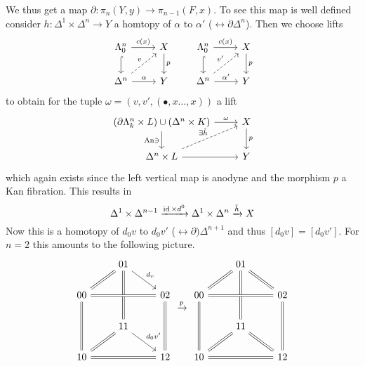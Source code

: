 \begin{construction}
    We thus get a map $\partial \colon \pi_n(Y,y) \to \pi_{n-1}(F,x)$.
    To see this map is well defined consider $h\colon \Delta^1 \times \Delta^n \to Y$ a homtopy of $\alpha$ to $\alpha'$ ($\rel \partial \Delta^n$).
    Then we choose lifts 
    \[
    \begin{tikzcd}
        \Lambda_0^n
        \ar[r, "c(x)"]
        \ar[d, hook]
        &
        X
        \ar[d,"p"]
        \\
        \Delta^n 
        \ar[ru, dashed, "v"]
        \ar[r, "\alpha"]
        &
        Y
    \end{tikzcd}
    \qquad
    \begin{tikzcd}
        \Lambda_0^n
        \ar[r, "c(x)"]
        \ar[d, hook]
        &
        X
        \ar[d,"p"]
        \\
        \Delta^n 
        \ar[ru, dashed, "v'"]
        \ar[r, "\alpha'"]
        &
        Y
    \end{tikzcd}
    \]
    to obtain for the tuple $\omega=(v,v',(\bullet,x \dotsc, x))$ a lift
    \[
    \begin{tikzcd}
        (\partial \Lambda_k^n \times L) \cup (\Delta^n \times K)
        \ar[r, "\omega"]
        \ar[d, "\An \ni"']
        &
        X
        \ar[d, "p"]
        \\
        \Delta^n \times L 
        \ar[r]
        \ar[ru, dashed, "\exists \Tilde{h}"]
        &
        Y
    \end{tikzcd}
    \]
    which again exists since the left vertical map is anodyne and the morphism $p$ a Kan fibration.
    This results in 
    \[
        \Delta^1 \times \Delta^{n-1} \xrightarrow{\operatorname{id} \times d^0} \Delta^1 \times \Delta^n \xrightarrow{\Tilde{h}} X
    \]
    Now this is a homotopy of $d_0v$ to $d_0v'$ ($\rel \partial) \Delta^{n+1}$ and thus $[d_0v]=[d_0v']$.
    For $ n = 2 $ this amounts to the following picture.
    \[
    \begin{tikzcd}
        &
        01
        \ar[rd, "d_v"]
        \ar[dd, equal]
        \\
        00
        \ar[rr, equal]
        \ar[ru, equal]
        \ar[dd, equal]
        &&
        02
        \ar[dd, equal]
        \\
        &
        11
        \ar[rd, "d_0v'"]
        \\
        10
        \ar[ru, equal]
        \ar[rr, equal]
        &&
        12
    \end{tikzcd}
    \xrightarrow{p}
    \begin{tikzcd}
        &
        01
        \ar[rd, equal]
        \ar[dd, equal]
        \\
        00
        \ar[ru, equal]
        \ar[rr, equal]
        \ar[dd, equal]
        &&
        02
        \ar[dd, equal]
        \\
        &
        11
        \ar[rd, equal]
        \\
        10
        \ar[ru, equal]
        \ar[rr, equal]
        &&
        12
    \end{tikzcd}
    \]
\end{construction}

